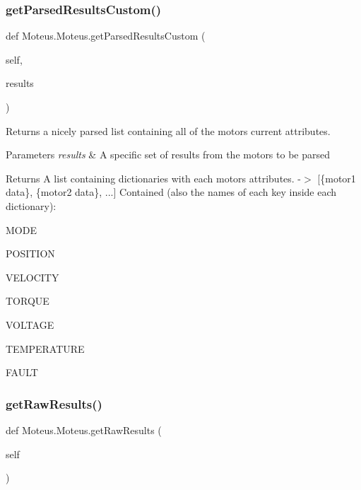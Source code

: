 \subsubsection{\texorpdfstring{get\+Parsed\+Results\+Custom()}{getParsedResultsCustom()}}
{\footnotesize\ttfamily def Moteus.\+Moteus.\+get\+Parsed\+Results\+Custom (\begin{DoxyParamCaption}\item[{}]{self,  }\item[{}]{results }\end{DoxyParamCaption})}



Returns a nicely parsed list containing all of the motor\textquotesingle{}s current attributes. 


\begin{DoxyParams}{Parameters}
{\em results} & A specific set of results from the motors to be parsed\\
\hline
\end{DoxyParams}
\begin{DoxyReturn}{Returns}
A list containing dictionaries with each motor\textquotesingle{}s attributes. -\/$>$ \mbox{[}\{motor1 data\}, \{motor2 data\}, ...\mbox{]} Contained (also the names of each key inside each dictionary)\+:
\begin{DoxyItemize}
\item M\+O\+DE
\item P\+O\+S\+I\+T\+I\+ON
\item V\+E\+L\+O\+C\+I\+TY
\item T\+O\+R\+Q\+UE
\item V\+O\+L\+T\+A\+GE
\item T\+E\+M\+P\+E\+R\+A\+T\+U\+RE
\item F\+A\+U\+LT 
\end{DoxyItemize}
\end{DoxyReturn}
\mbox{\label{classMoteus_1_1Moteus_aa9dc57d842421f50e803f4aa908a924e}} 
\subsubsection{\texorpdfstring{get\+Raw\+Results()}{getRawResults()}}
{\footnotesize\ttfamily def Moteus.\+Moteus.\+get\+Raw\+Results (\begin{DoxyParamCaption}\item[{}]{self }\end{DoxyParamCaption})}



